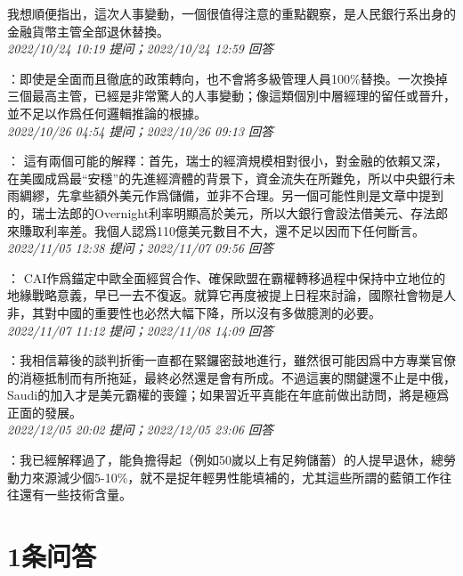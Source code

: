\documentclass[twocolumn]{ctexart}
\begin{document}
我想順便指出，這次人事變動，一個很值得注意的重點觀察，是人民銀行系出身的金融貨幣主管全部退休替換。
\\

\textit{\hfill\noindent\small 2022/10/24 10:19 提问；2022/10/24 12:59 回答}

：即使是全面而且徹底的政策轉向，也不會將多級管理人員100\%替換。一次換掉三個最高主管，已經是非常驚人的人事變動；像這類個別中層經理的留任或晉升，並不足以作爲任何邏輯推論的根據。
\\

\textit{\hfill\noindent\small 2022/10/26 04:54 提问；2022/10/26 09:13 回答}

：
這有兩個可能的解釋：首先，瑞士的經濟規模相對很小，對金融的依賴又深，在美國成爲最“安穩”的先進經濟體的背景下，資金流失在所難免，所以中央銀行未雨綢繆，先拿些額外美元作爲儲備，並非不合理。另一個可能性則是文章中提到的，瑞士法郎的Overnight利率明顯高於美元，所以大銀行會設法借美元、存法郎來賺取利率差。我個人認爲110億美元數目不大，還不足以因而下任何斷言。
\\

\textit{\hfill\noindent\small 2022/11/05 12:38 提问；2022/11/07 09:56 回答}

：
CAI作爲錨定中歐全面經貿合作、確保歐盟在霸權轉移過程中保持中立地位的地緣戰略意義，早已一去不復返。就算它再度被提上日程來討論，國際社會物是人非，其對中國的重要性也必然大幅下降，所以沒有多做臆測的必要。
\\

\textit{\hfill\noindent\small 2022/11/07 11:12 提问；2022/11/08 14:09 回答}

：我相信幕後的談判折衝一直都在緊鑼密鼓地進行，雖然很可能因爲中方專業官僚的消極抵制而有所拖延，最終必然還是會有所成。不過這裏的關鍵還不止是中俄，Saudi的加入才是美元霸權的喪鐘；如果習近平真能在年底前做出訪問，將是極爲正面的發展。
\\

\textit{\hfill\noindent\small 2022/12/05 20:02 提问；2022/12/05 23:06 回答}

：我已經解釋過了，能負擔得起（例如50嵗以上有足夠儲蓄）的人提早退休，總勞動力來源減少個5-10\%，就不是捉年輕男性能填補的，尤其這些所謂的藍領工作往往還有一些技術含量。
\\

\section{1条问答}
\end{document}
